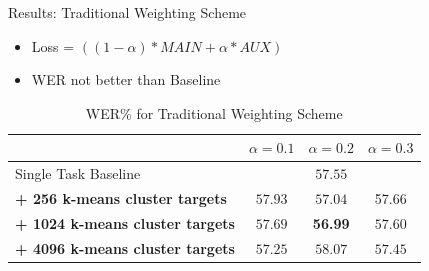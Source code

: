\documentclass[final]{beamer} %
\begin{document}
\begin{frame}
\begin{columns}
\begin{column}{0.23\textwidth}
{        \vspace{1cm}
        
        \begin{block}{\boxnumber Results: Traditional Weighting Scheme}
          \begin{itemize}
          \item Loss = $((1-\alpha)*MAIN + \alpha*AUX)$
          \item WER not better than Baseline
          \end{itemize}
        \end{block}

        
        \vfill
        

                  
          \begin{table}[!htbp]
            \centering
            \caption{WER\% for Traditional Weighting Scheme}
            \begin{adjustbox}{width=\textwidth}
              \begin{tabular}{lccc}
                \toprule
                & $\alpha = 0.1 $ & $\alpha = 0.2 $ & $\alpha = 0.3 $\\
                \midrule
                Single Task Baseline  &  \multicolumn{3}{c}{$57.55$ \raisebox{.33\height}{\footnotesize{$\pm 1.82$}}}     \\
                
                \textbf{+ 256 k-means cluster targets}  &  $57.93$ \raisebox{.33\height}{\footnotesize{$\pm 1.63$}}   &  $57.04$ \raisebox{.33\height}{\footnotesize{$\pm 1.58$}}     & 57.66 \raisebox{.33\height}{\footnotesize{$\pm 1.24$}} \\
                
                \textbf{+ 1024 k-means cluster targets}   & $57.69$ \raisebox{.33\height}{\footnotesize{$\pm 3.78$}}    & \textbf{56.99} \raisebox{.33\height}{\footnotesize{$\pm 3.08$}}    & $57.60$ \raisebox{.33\height}{\footnotesize{$\pm 0.79$}}  \\
                
                \textbf{+ 4096 k-means cluster targets}   &  $57.25$ \raisebox{.33\height}{\footnotesize{$\pm 2.87$}}  & $58.07$ \raisebox{.33\height}{\footnotesize{$\pm 1.35$}}   &   $57.45$ \raisebox{.33\height}{\footnotesize{$\pm 0.32$}}  \\
                \bottomrule
              \end{tabular}
            \end{adjustbox}
          \end{table}


}
\end{column}
\end{columns}
\end{frame}
\end{document}
